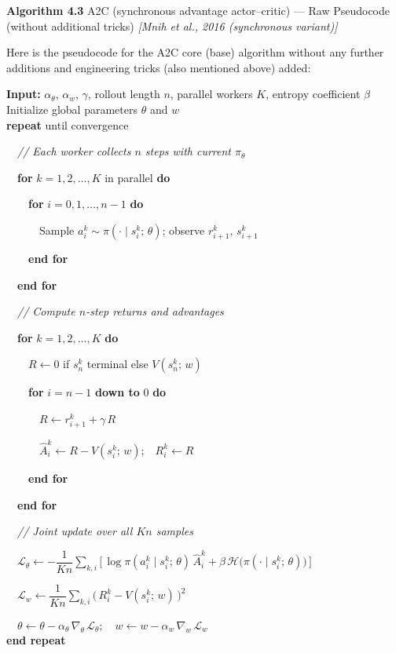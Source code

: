 \documentclass[11pt]{article}
\begin{document}
    \label{pseudo-4-3}

    \begin{pseudobox}

\textbf{Algorithm 4.3} A2C (synchronous advantage actor--critic) --- Raw
Pseudocode (without additional tricks) \emph{{[}Mnih et al., 2016
(synchronous variant){]}}

\tcbline

Here is the pseudocode for the A2C core (base) algorithm without any
further additions and engineering tricks (also mentioned above) added:

\textbf{Input:} \(\alpha_\theta\), \(\alpha_w\), \(\gamma\), rollout
length \(n\), parallel workers \(K\), entropy coefficient \(\beta\)\\
Initialize global parameters \(\theta\) and \(w\)\\
\textbf{repeat} until convergence\\
\strut ~~\emph{// Each worker collects \(n\) steps with current
\(\pi_\theta\)}\\
\strut ~~\textbf{for} \(k = 1, 2, \ldots, K\) in parallel \textbf{do}\\
\strut ~~~~\textbf{for} \(i = 0, 1, \ldots, n - 1\) \textbf{do}\\
\strut ~~~~~~Sample \(a_i^{k} \sim \pi(\cdot \mid s_i^{k};\, \theta)\);
observe \(r_{i+1}^{k},\, s_{i+1}^{k}\)\\
\strut ~~~~\textbf{end for}\\
\strut ~~\textbf{end for}\\
\strut ~~\emph{// Compute \(n\)-step returns and advantages}\\
\strut ~~\textbf{for} \(k = 1, 2, \ldots, K\) \textbf{do}\\
\strut ~~~~\(R \leftarrow 0\) if \(s_n^{k}\) terminal else
\(V(s_n^{k};\, w)\)\\
\strut ~~~~\textbf{for} \(i = n - 1\) \textbf{down to} \(0\)
\textbf{do}\\
\strut ~~~~~~\(R \leftarrow r_{i+1}^{k} + \gamma\, R\)\\
\strut ~~~~~~\(\hat{A}_i^{k} \leftarrow R - V(s_i^{k};\, w)\);\(\quad R_i^{k} \leftarrow R\)\\
\strut ~~~~\textbf{end for}\\
\strut ~~\textbf{end for}\\
\strut ~~\emph{// Joint update over all \(K n\) samples}\\
\strut ~~\(\mathcal{L}_\theta \leftarrow -\dfrac{1}{K n} \sum_{k, i} \bigl[\, \log \pi(a_i^{k} \mid s_i^{k};\, \theta)\, \hat{A}_i^{k} + \beta\, \mathcal{H}\bigl(\pi(\cdot \mid s_i^{k};\, \theta)\bigr) \,\bigr]\)\\
\strut ~~\(\mathcal{L}_w \leftarrow \dfrac{1}{K n} \sum_{k, i} \bigl(\, R_i^{k} - V(s_i^{k};\, w) \,\bigr)^{2}\)\\
\strut ~~\(\theta \leftarrow \theta - \alpha_\theta\, \nabla_{\theta}\, \mathcal{L}_\theta;\quad w \leftarrow w - \alpha_w\, \nabla_{w}\, \mathcal{L}_w\)\\
\textbf{end repeat}

\end{pseudobox}
\end{document}
